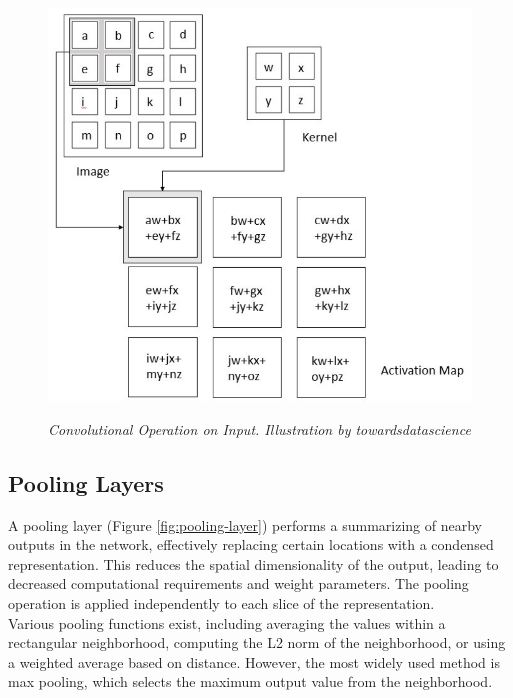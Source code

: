\begin{figure}[H] \centering
  \begin{adjustbox}{width=0.75\textwidth, trim={0cm 0cm 0cm 0.35cm}, clip}
  \includegraphics[]{imatges/preliminaries/convolutional-layer.png}
  \end{adjustbox}
  \caption[Convolutional Operation on Input]{\textit{Convolutional
  Operation on Input. Illustration by towardsdatascience}}
{\label{fig:convolutional-layer}} \end{figure}

\newpage

\subsection{Pooling Layers}

A pooling layer (Figure \ref{fig:pooling-layer}) performs a
summarizing of nearby outputs in the network, effectively replacing certain
locations with a condensed representation. This reduces the spatial
dimensionality of the output, leading to decreased computational requirements
and weight parameters. The pooling operation is applied independently to each
slice of the representation. \\

Various pooling functions exist, including averaging the values within a
rectangular neighborhood, computing the L2 norm of the neighborhood, or using a
weighted average based on distance. However, the most widely used method is max
pooling, which selects the maximum output value from the neighborhood.


